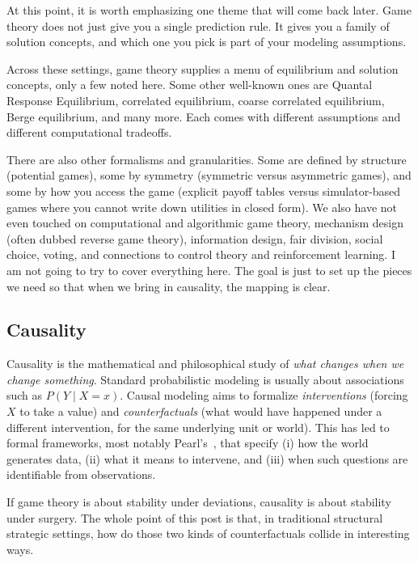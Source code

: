 \documentclass{article}
\begin{document}
At this point, it is worth emphasizing one theme that will come back later. Game theory does not just give you a single prediction rule. It gives you a family of solution concepts, and which one you pick is part of your modeling assumptions.

Across these settings, game theory supplies a menu of equilibrium and solution concepts, only a few noted here. Some other well-known ones are Quantal Response Equilibrium, correlated equilibrium, coarse correlated equilibrium, Berge equilibrium, and many more. Each comes with different assumptions and different computational tradeoffs.

There are also other formalisms and granularities. Some are defined by structure (potential games), some by symmetry (symmetric versus asymmetric games), and some by how you access the game (explicit payoff tables versus simulator-based games where you cannot write down utilities in closed form). We also have not even touched on computational and algorithmic game theory, mechanism design (often dubbed reverse game theory), information design, fair division, social choice, voting, and connections to control theory and reinforcement learning. I am not going to try to cover everything here. The goal is just to set up the pieces we need so that when we bring in causality, the mapping is clear.

\subsection{Causality}
Causality is the mathematical and philosophical study of \emph{what changes when we change something}. Standard probabilistic modeling is usually about associations such as \(P(Y \mid X=x)\). Causal modeling aims to formalize \emph{interventions} (forcing \(X\) to take a value) and \emph{counterfactuals} (what would have happened under a different intervention, for the same underlying unit or world). This has led to formal frameworks, most notably Pearl's~\cite{pearl2009causality}, that specify (i) how the world generates data, (ii) what it means to intervene, and (iii) when such questions are identifiable from observations.

If game theory is about stability under deviations, causality is about stability under surgery. The whole point of this post is that, in traditional structural strategic settings, how do those two kinds of counterfactuals collide in interesting ways.
\end{document}
